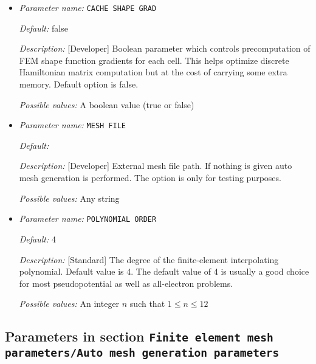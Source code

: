 \begin{itemize}
\item {\it Parameter name:} {\tt CACHE SHAPE GRAD}
\label{parameters:Finite element mesh parameters/CACHE SHAPE GRAD}
\label{parameters:Finite_20element_20mesh_20parameters/CACHE_20SHAPE_20GRAD}




{\it Default:} false


{\it Description:} [Developer] Boolean parameter which controls precomputation of FEM shape function gradients for each cell. This helps optimize discrete Hamiltonian matrix computation but at the cost of carrying some extra memory. Default option is false.


{\it Possible values:} A boolean value (true or false)
\item {\it Parameter name:} {\tt MESH FILE}
\label{parameters:Finite element mesh parameters/MESH FILE}
\label{parameters:Finite_20element_20mesh_20parameters/MESH_20FILE}




{\it Default:} 


{\it Description:} [Developer] External mesh file path. If nothing is given auto mesh generation is performed. The option is only for testing purposes.


{\it Possible values:} Any string
\item {\it Parameter name:} {\tt POLYNOMIAL ORDER}
\label{parameters:Finite element mesh parameters/POLYNOMIAL ORDER}
\label{parameters:Finite_20element_20mesh_20parameters/POLYNOMIAL_20ORDER}




{\it Default:} 4


{\it Description:} [Standard] The degree of the finite-element interpolating polynomial. Default value is 4. The default value of 4 is usually a good choice for most pseudopotential as well as all-electron problems.


{\it Possible values:} An integer $n$ such that $1\leq n \leq 12$
\end{itemize}



\subsection{Parameters in section \tt Finite element mesh parameters/Auto mesh generation parameters}
\label{parameters:Finite_20element_20mesh_20parameters/Auto_20mesh_20generation_20parameters}

